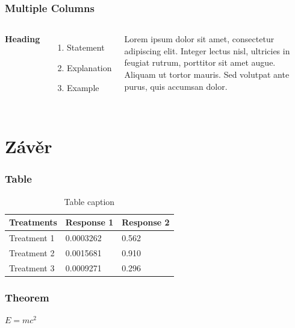 \documentclass[mathserif]{beamer}
\begin{document}

\begin{frame}
\frametitle{Multiple Columns}
\begin{columns}[c] %

\textbf{Heading}
\begin{enumerate}
\item Statement
\item Explanation
\item Example
\end{enumerate}

Lorem ipsum dolor sit amet, consectetur adipiscing elit. Integer lectus nisl, ultricies in feugiat rutrum, porttitor sit amet augue. Aliquam ut tortor mauris. Sed volutpat ante purus, quis accumsan dolor.

\end{columns}
\end{frame}

\section{Závěr}

\begin{frame}
\frametitle{Table}
\begin{table}
\begin{tabular}{l l l}
\toprule
\textbf{Treatments} & \textbf{Response 1} & \textbf{Response 2}\\
\midrule
Treatment 1 & 0.0003262 & 0.562 \\
Treatment 2 & 0.0015681 & 0.910 \\
Treatment 3 & 0.0009271 & 0.296 \\
\bottomrule
\end{tabular}
\caption{Table caption}
\end{table}
\end{frame}


\begin{frame}
\frametitle{Theorem}
\begin{theorem}
$E = mc^2$
\end{theorem}
\end{frame}
\end{document}

